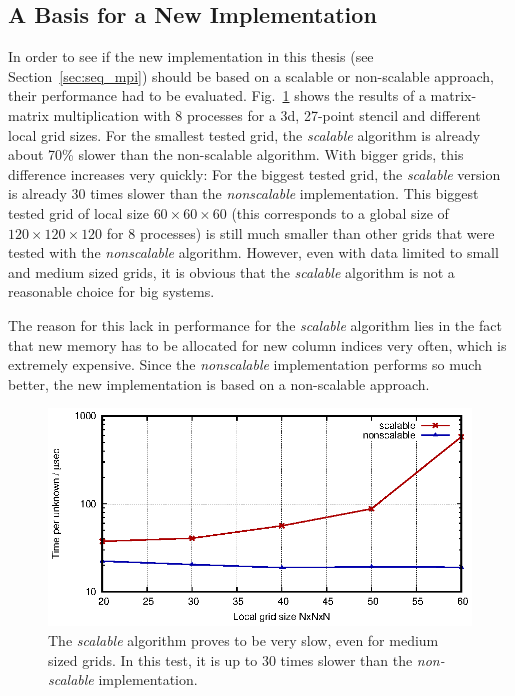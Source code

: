 \subsection{A Basis for a New Implementation}
In order to see if the new implementation in this thesis (see Section~\ref{sec:seq_mpi}) should be based on a scalable or non-scalable approach, their performance had to be evaluated. Fig.~\ref{fig:scalable} shows the results of a matrix-matrix multiplication with 8 processes for a 3d, 27-point stencil and different local grid sizes. For the smallest tested grid, the \textit{scalable} algorithm is already about 70\% slower than the non-scalable algorithm. With bigger grids, this difference increases very quickly: For the biggest tested grid, the \textit{scalable} version is already 30 times slower than the \textit{nonscalable} implementation. This biggest tested grid of local size $60 \times 60 \times 60$ (this corresponds to a global size of $120\times 120 \times 120$ for 8 processes) is still much smaller than other grids that were tested with the \textit{nonscalable} algorithm. However, even with data limited to small and medium sized grids, it is obvious that the \textit{scalable} algorithm is not a reasonable choice for big systems. 

The reason for this lack in performance for the \textit{scalable} algorithm lies in the fact that new memory has to be allocated for new column indices very often, which is extremely expensive. Since the \textit{nonscalable} implementation performs so much better, the new implementation is based on a non-scalable approach. 

\begin{figure}[tbp]
	\centering
	\includegraphics[width=1\textwidth]{scalable}
	\caption{The \textit{scalable} algorithm proves to be very slow, even for medium sized grids. In this test, it is up to 30 times slower than the \textit{non-scalable} implementation.} 
	\label{fig:scalable}
\end{figure}

